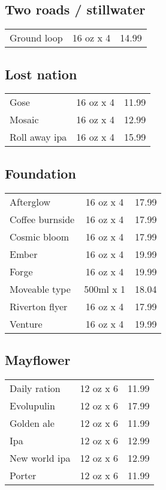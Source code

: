 \documentclass{article}%
\begin{document}
\begin{multicols}{3}
%
\subsection*{Two roads / stillwater}%
\begin{tabular}{l c r}%
Ground loop&16 oz x 4&14.99\\%
\end{tabular}

%
\subsection*{Lost nation}%
\begin{tabular}{l c r}%
Gose&16 oz x 4&11.99\\%
Mosaic&16 oz x 4&12.99\\%
Roll away ipa&16 oz x 4&15.99\\%
\end{tabular}

%
\subsection*{Foundation}%
\begin{tabular}{l c r}%
Afterglow&16 oz x 4&17.99\\%
Coffee burnside&16 oz x 4&17.99\\%
Cosmic bloom&16 oz x 4&17.99\\%
Ember&16 oz x 4&19.99\\%
Forge&16 oz x 4&19.99\\%
Moveable type&500ml x 1&18.04\\%
Riverton flyer&16 oz x 4&17.99\\%
Venture&16 oz x 4&19.99\\%
\end{tabular}

%
\subsection*{Mayflower}%
\begin{tabular}{l c r}%
Daily ration&12 oz x 6&11.99\\%
Evolupulin&12 oz x 6&17.99\\%
Golden ale&12 oz x 6&11.99\\%
Ipa&12 oz x 6&12.99\\%
New world ipa&12 oz x 6&12.99\\%
Porter&12 oz x 6&11.99\\%
\end{tabular}


\end{multicols}
\end{document}
